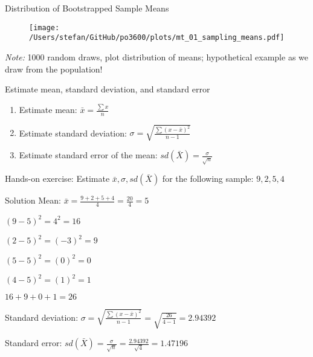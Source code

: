 \documentclass[10pt]{beamer}
\begin{document}
\begin{frame}{Distribution of Bootstrapped Sample Means}

\begin{figure} \centering
\texttt{[image: /Users/stefan/GitHub/po3600/plots/mt\_01\_sampling\_means.pdf]}
\end{figure}
\textit{Note:} 1000 random draws, plot distribution of means; hypothetical example as we draw from the population!
\end{frame}


\begin{frame}{Estimate  mean, standard deviation, and standard error}
\begin{enumerate}
\item Estimate mean: $\bar{x}=\frac{\sum{x}}{n}$
\item Estimate standard deviation: $\sigma=\sqrt{\frac{\sum(x-\bar{x})^{2}}{n-1}}$
\item Estimate standard error of the mean: $sd(\bar{X})=\frac{\sigma}{\sqrt{n}}$
\end{enumerate}
\pause
Hands-on exercise: Estimate $\bar{x},\sigma, sd(\bar{X})$ for the following sample:
$9, 2, 5, 4$
\end{frame}

\begin{frame}{Solution}
Mean: $\bar{x}=\frac{9 + 2 + 5 + 4}{4} = \frac{20}{4}=5$

\pause

$(9 - 5)^{2} = 4^{2} = 16$

$(2 - 5)^{2} = (-3)^{2} = 9$

$(5 - 5)^{2} = (0)^{2} = 0$

$(4 - 5)^{2} = (1)^{2} = 1$

\pause

$16 + 9 +  0 + 1 = 26$

\pause 

Standard deviation: $\sigma=\sqrt{\frac{\sum(x-\bar{x})^{2}}{n-1}} = \sqrt{\frac{26}{4-1}}= 2.94392$

\pause
Standard error:  $sd(\bar{X})=\frac{\sigma}{\sqrt{n}}=\frac{2.94392}{\sqrt{4}}=1.47196$

\end{frame}



\end{document}
